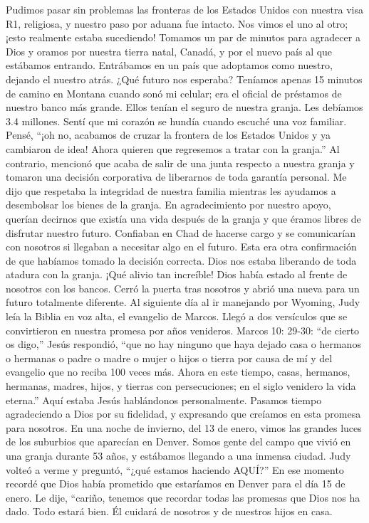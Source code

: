 \documentclass[twoside, 12pt]{book}
\begin{document}
Pudimos pasar sin problemas las fronteras de los Estados Unidos con nuestra visa R1, religiosa, y nuestro paso por aduana fue intacto. Nos vimos el uno al otro; ¡esto realmente estaba sucediendo! Tomamos un par de minutos para agradecer a Dios y oramos por nuestra tierra natal, Canadá, y por el nuevo país al que estábamos entrando. Entrábamos en un país que adoptamos como nuestro, dejando el nuestro atrás. ¿Qué futuro nos esperaba?  Teníamos apenas 15 minutos de camino en Montana cuando sonó mi celular; era el oficial de préstamos de nuestro banco más grande. Ellos tenían el seguro de nuestra granja. Les debíamos 3.4 millones. Sentí que mi corazón se hundía cuando escuché una voz familiar. Pensé, “¡oh no, acabamos de cruzar la frontera de los Estados Unidos y ya cambiaron de idea! Ahora quieren que regresemos a tratar con la granja.” Al contrario, mencionó que acaba de salir de una junta respecto a nuestra granja y tomaron una decisión corporativa de liberarnos de toda garantía personal. Me dijo que respetaba la integridad de nuestra familia mientras les ayudamos a desembolsar los bienes de la granja. En agradecimiento por nuestro apoyo, querían decirnos que existía una vida después de la granja y que éramos libres de disfrutar nuestro futuro. Confiaban en Chad de hacerse cargo y se comunicarían con nosotros si llegaban a necesitar algo en el futuro. Esta era otra confirmación de que habíamos tomado la decisión correcta. Dios nos estaba liberando de toda atadura con la granja. ¡Qué alivio tan increíble! Dios había estado al frente de nosotros con los bancos. Cerró la puerta tras nosotros y abrió una nueva para un futuro totalmente diferente. 
Al siguiente día al ir manejando por Wyoming, Judy leía la Biblia en voz alta, el evangelio de Marcos. Llegó a dos versículos que se convirtieron en nuestra promesa por años venideros. Marcos 10: 29-30: “de cierto os digo,” Jesús respondió, “que no hay ninguno que haya dejado casa o hermanos o hermanas o padre o madre o mujer o hijos o tierra por causa de mí y del evangelio que no reciba 100 veces más. Ahora en este tiempo, casas, hermanos, hermanas, madres, hijos, y tierras con persecuciones; en el siglo venidero la vida eterna.” Aquí estaba Jesús hablándonos personalmente. Pasamos tiempo agradeciendo a Dios por su fidelidad, y expresando que creíamos en esta promesa para nosotros. En una noche de invierno, del 13 de enero, vimos las grandes luces de los suburbios que aparecían en Denver. Somos gente del campo que vivió en una granja durante 53 años, y estábamos llegando a una inmensa ciudad. Judy volteó a verme y preguntó, “¿qué estamos haciendo AQUÍ?” En ese momento recordé que Dios había prometido que estaríamos en Denver para el día 15 de enero. Le dije, “cariño, tenemos que recordar todas las promesas que Dios nos ha dado. Todo estará bien. Él cuidará de nosotros y de nuestros hijos en casa.\\
\end{document}
